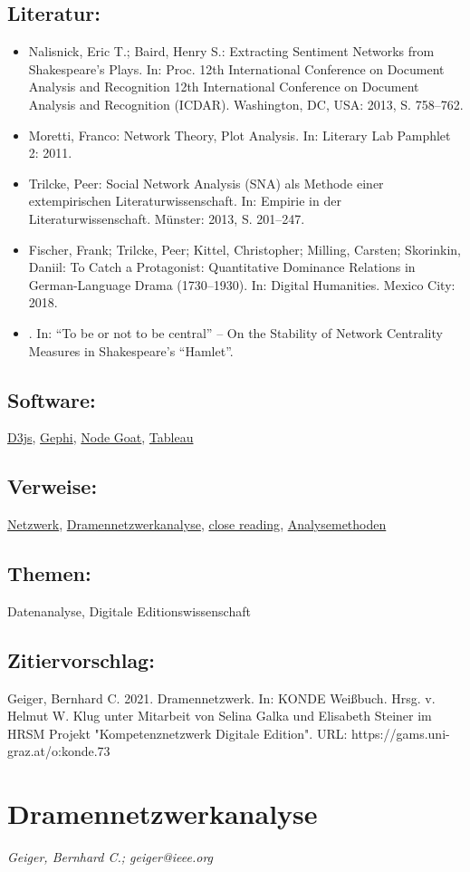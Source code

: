 \documentclass{article}
\begin{document}
        \subsection*{Literatur:}\begin{itemize}\item Nalisnick, Eric T.; Baird, Henry S.: Extracting Sentiment Networks from Shakespeare's Plays. In: Proc. 12th International Conference on Document Analysis and Recognition 12th International Conference on Document Analysis and Recognition (ICDAR). Washington, DC, USA: 2013, S. 758–762.\item Moretti, Franco: Network Theory, Plot Analysis. In: Literary Lab Pamphlet 2: 2011.\item Trilcke, Peer: Social Network Analysis (SNA) als  Methode einer  extempirischen Literaturwissenschaft. In: Empirie in der Literaturwissenschaft. Münster: 2013, S. 201–247.\item Fischer, Frank; Trilcke, Peer; Kittel, Christopher; Milling, Carsten; Skorinkin, Daniil: To Catch a Protagonist: Quantitative Dominance Relations in German-Language Drama (1730–1930). In: Digital Humanities. Mexico City: 2018.\item . In: “To be or not to be central” – On the Stability of Network Centrality Measures in Shakespeare’s “Hamlet”.\end{itemize}\subsection*{Software:}\href{https://d3js.org}{D3js}, \href{https://gephi.org/}{Gephi}, \href{https://nodegoat.net/}{Node Goat}, \href{https://public.tableau.com/s/}{Tableau}\subsection*{Verweise:}\href{https://gams.uni-graz.at/o:konde.144}{Netzwerk}, \href{https://gams.uni-graz.at/o:konde.74}{Dramennetzwerkanalyse}, \href{https://gams.uni-graz.at/o:konde.71}{close reading}, \href{https://gams.uni-graz.at/o:konde.16}{Analysemethoden}\subsection*{Themen:}Datenanalyse, Digitale Editionswissenschaft\subsection*{Zitiervorschlag:}Geiger, Bernhard C. 2021. Dramennetzwerk. In: KONDE Weißbuch. Hrsg. v. Helmut W. Klug unter Mitarbeit von Selina Galka und Elisabeth Steiner im HRSM Projekt "Kompetenznetzwerk Digitale Edition". URL: https://gams.uni-graz.at/o:konde.73\newpage\section*{Dramennetzwerkanalyse} \emph{Geiger, Bernhard C.; geiger@ieee.org }\\
        
\end{document}
